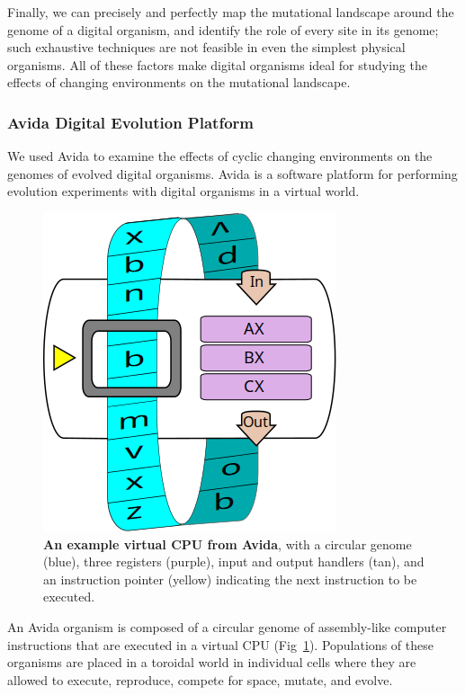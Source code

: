 \documentclass[10pt,letterpaper]{article}
\begin{document}
Finally, we can precisely and perfectly map the mutational landscape around the genome of a digital organism, and identify the role of every site in its genome\cite{ofria_evolution_2002}; such exhaustive techniques are not feasible in even the simplest physical organisms.  All of these factors make digital organisms ideal for studying the effects of changing environments on the mutational landscape.

\subsubsection*{Avida Digital Evolution Platform}
We used Avida \cite{lenski_evolutionary_2003} to examine the effects of cyclic changing environments on the genomes of evolved digital organisms. Avida is a software platform for performing evolution experiments with digital organisms in a virtual world.

\begin{figure}[!h]
\includegraphics[width=0.5\columnwidth]{figures/methods/squishedCPU_extra.png}
\caption{{\bf An example virtual CPU from Avida}, with a circular genome (blue), three registers (purple), input and output handlers (tan), and an instruction pointer (yellow) indicating the next instruction to be executed.%
}\label{fig:cpu}
\end{figure}

An Avida organism is composed of a circular genome of assembly-like computer instructions that are executed in a virtual CPU (Fig~\ref{fig:cpu}). Populations of these organisms are placed in a toroidal world in individual cells where they are allowed to execute, reproduce, compete for space, mutate, and evolve.
\end{document}
